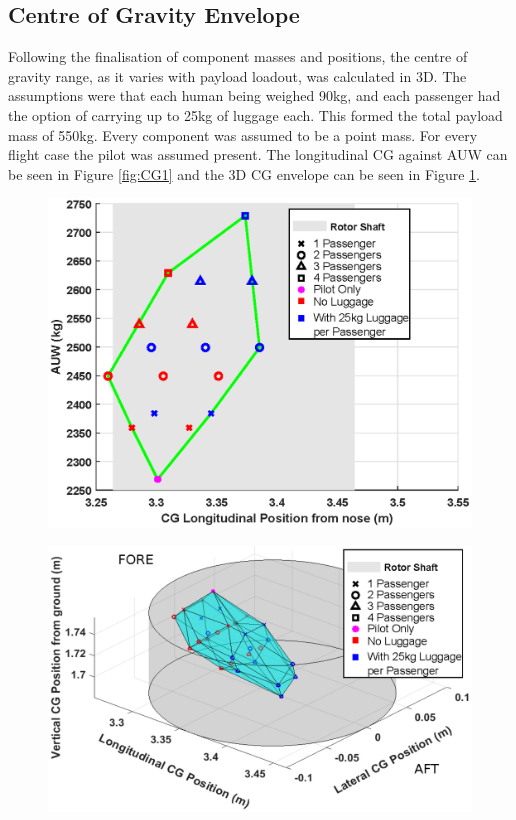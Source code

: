 \documentclass[11pt,a4paper]{article}
\begin{document}
\subsection{Centre of Gravity Envelope}
Following the finalisation of component masses and positions, the centre of gravity range, as it varies with payload loadout, was calculated in 3D. The assumptions were that each human being weighed 90kg, and each passenger had the option of carrying up to 25kg of luggage each. This formed the total payload mass of 550kg. Every component was assumed to be a point mass. For every flight case the pilot was assumed present.
The longitudinal CG against AUW can be seen in Figure \ref{fig:CG1} and the 3D CG envelope can be seen in Figure \ref{fig:CG2}.

\begin{figure}[H]
\centering
\begin{minipage}{.5\textwidth}
  \centering
  \includegraphics[width=\linewidth]{CGLONGVAUW.eps}
  \label{fig:CG1}
\end{minipage}%
\begin{minipage}{.5\textwidth}
  \centering
  \includegraphics[width=\linewidth]{CG3D.eps}
  \label{fig:CG2}
\end{minipage}
\end{figure}
\end{document}
